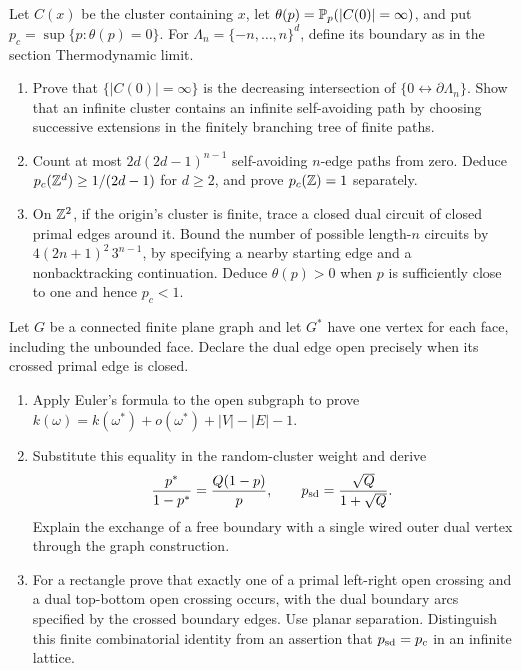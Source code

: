 \begin{exercise}
Let $C(x)$ be the cluster containing $x$, let
$\theta(p)=\mathbb P_p(|C(0)|=\infty)$, and put
$p_c=\sup\{p:\theta(p)=0\}$.
For $\Lambda_n=\{-n,\dots,n\}^d$, define its boundary as
in the section Thermodynamic limit.
\begin{enumerate}[label=(\alph*)]
\item Prove that $\{|C(0)|=\infty\}$ is the decreasing
intersection of $\{0\leftrightarrow\partial\Lambda_n\}$.
Show that an infinite cluster contains an infinite
self-avoiding path by choosing successive extensions in
the finitely branching tree of finite paths.
\item Count at most $2d(2d-1)^{n-1}$ self-avoiding
$n$-edge paths from zero. Deduce
$p_c(\mathbb Z^d)\ge1/(2d-1)$ for $d\ge2$, and prove
$p_c(\mathbb Z)=1$ separately.
\item On $\mathbb Z^2$, if the origin's cluster is finite, trace a
closed dual circuit of closed primal edges around it.
Bound the number of possible length-$n$ circuits by
$4(2n+1)^2\,3^{n-1}$, by specifying a nearby starting edge
and a nonbacktracking continuation. Deduce $\theta(p)>0$
when $p$ is sufficiently close to one and hence $p_c<1$.
\end{enumerate}
\end{exercise}

\begin{exercise}
Let $G$ be a connected finite plane graph and let $G^*$
have one vertex for each face, including the unbounded face.
Declare the dual edge open precisely when its crossed
primal edge is closed.
\begin{enumerate}[label=(\alph*)]
\item Apply Euler's formula to the open subgraph to prove
$k(\omega)=k(\omega^*)+o(\omega^*)+|V|-|E|-1$.
\item Substitute this equality in the random-cluster weight
and derive
\[
 \frac{p^*}{1-p^*}=\frac{Q(1-p)}p,\qquad
 p_{\rm sd}=\frac{\sqrt Q}{1+\sqrt Q}.
\]
Explain the exchange of a free boundary with a single wired
outer dual vertex through the graph construction.
\item For a rectangle prove that exactly one of a primal
left-right open crossing and a dual top-bottom open
crossing occurs, with the dual boundary arcs specified
by the crossed boundary edges. Use planar separation.
Distinguish this finite combinatorial identity from an
assertion that $p_{\rm sd}=p_c$ in an infinite lattice.
\end{enumerate}
\end{exercise}

